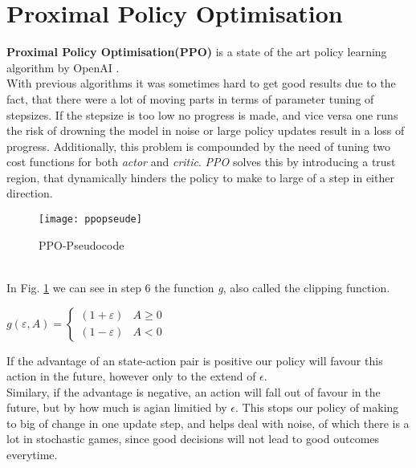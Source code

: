 \section{Proximal Policy Optimisation}
\textbf{Proximal Policy Optimisation(PPO)} is a state of the art policy learning algorithm by OpenAI
.\cite{schulman2017proximal}\\
With previous algorithms it was sometimes hard to get good results due to the fact, that there were a lot of
moving parts in terms of parameter tuning of stepsizes.
If the stepsize is too low no progress is made, and vice versa one runs the risk of drowning the model in noise or
large policy updates result in a loss of progress.
Additionally, this problem is compounded by the need of tuning two cost functions for both \textit{actor} and
\textit{critic}.
\textit{PPO} solves this by introducing a trust region, that dynamically hinders the policy to make to large of a
step in either direction.
\begin{figure}[!ht]
    \centering
    \texttt{[image: ppopseude]}
    \caption{PPO-Pseudocode \cite{actorcritic}}
    \label{Pseudocode}
\end{figure}
\\
In Fig. \ref{Pseudocode} we can see in step 6 the function \textit{g}, also called the clipping function.
\begin{center}
    \begin{math}
        \boxed{
            g(\varepsilon,A) = \left\{\begin{matrix}
            (1+\varepsilon)
                                          & A \geq 0 \\
                                          (1-\varepsilon) & A < 0
            \end{matrix}\right.
        }
    \end{math}
\end{center}
If the advantage of an state-action pair is positive our policy will favour this action in the future, however only
to the extend of $\epsilon.$\\
Similary, if the advantage is negative, an action will fall out of favour in the future, but by how much is agian
limitied by $\epsilon$.
This stops our policy of making to big of change in one update step, and helps deal with noise, of which there is a
lot in stochastic games, since good decisions will not lead to good outcomes everytime.
